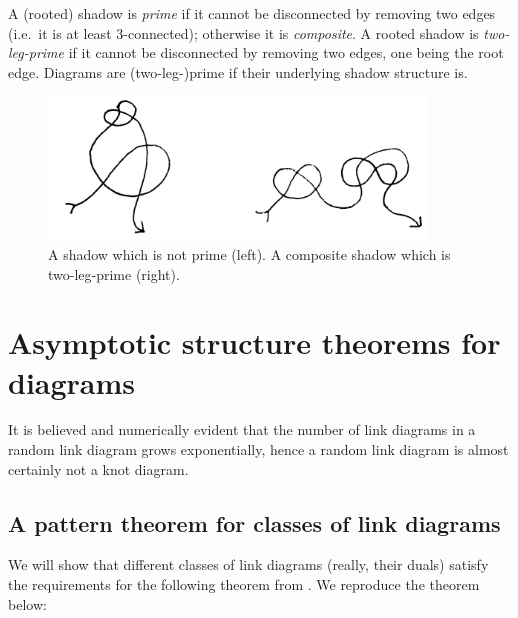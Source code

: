 \documentclass[amsmath,longbibliography,secnumarabic,floatfix,amssymb,nofootinbib,nobibnotes,letterpaper,11pt,notitlepage,preprint]{revtex4-1}
\begin{document}
A (rooted) shadow is \emph{prime} if it cannot be disconnected by removing two edges (i.e.\ it is at
least 3-connected); otherwise it is \emph{composite}. A rooted shadow is \emph{two-leg-prime} if it
cannot be disconnected by removing two edges, one being the root edge. Diagrams are (two-leg-)prime
if their underlying shadow structure is.

\begin{figure}[h!]  \centering
  \includegraphics[height=1.5in]{2leg_vs_reg_prime}
  \caption{A shadow which is not prime (left). A composite shadow which is two-leg-prime (right).}
  \label{fig:prime2legprime}
\end{figure}

\section{Asymptotic structure theorems for diagrams}
\label{sec:structure}

It is believed and numerically evident \cite{PZJasympconj2004} that the number of link diagrams in a
random link diagram grows exponentially, hence a random link diagram is almost certainly not a knot
diagram.

\subsection{A pattern theorem for classes of link diagrams}
\label{sec:patternthm}

\newcommand{\MapClass}{\mathscr{M}}

We will show that different classes of link diagrams (really, their duals) satisfy the requirements
for the following theorem from \cite{Bender1992104}. We reproduce the theorem below:
\end{document}
